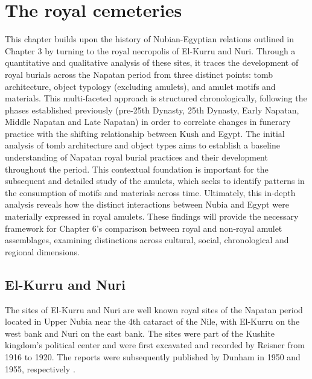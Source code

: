 \chapter{The royal cemeteries}


This chapter builds upon the history of Nubian-Egyptian relations outlined in Chapter 3 by turning to the royal necropolis of El-Kurru and Nuri. Through a quantitative and qualitative analysis of these sites, it traces the development of royal burials across the Napatan period from three distinct points: tomb architecture, object typology (excluding amulets), and amulet motifs and materials. This multi-faceted approach is structured chronologically, following the phases established previously (pre-25th Dynasty, 25th Dynasty, Early Napatan, Middle Napatan and Late Napatan) in order to correlate changes in funerary practice with the shifting relationship between Kush and Egypt. The initial analysis of tomb architecture and object types aims to establish a baseline understanding of Napatan royal burial practices and their development throughout the period. This contextual foundation is important for the subsequent and detailed study of the amulets, which seeks to identify patterns in the consumption of motifs and materials across time. Ultimately, this in-depth analysis reveals how the distinct interactions between Nubia and Egypt were materially expressed in royal amulets. These findings will provide the necessary framework for Chapter 6's comparison between royal and non-royal amulet assemblages, examining distinctions across cultural, social, chronological and regional dimensions.


\section{El-Kurru and Nuri}


The sites of El-Kurru and Nuri are well known royal sites of the Napatan period located in Upper Nubia near the 4th cataract of the Nile, with El-Kurru on the west bank and Nuri on the east bank. The sites were part of the Kushite kingdom's political center and were first excavated and recorded by Reisner from 1916 to 1920. The reports were subsequently published by Dunham in 1950 and 1955, respectively \parencites{emberlingNewFindsTwentyFifth2021, emberlingJebelBarkal201820232024}.



